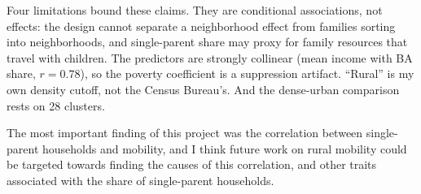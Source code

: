 \documentclass[9pt,twoside]{pnas-new}
\begin{document}
Four limitations bound these claims. They are conditional associations, not
effects: the design cannot separate a neighborhood effect from families sorting
into neighborhoods, and single-parent share may proxy for family resources that
travel with children. The predictors are strongly collinear (mean income with
BA share, $r=0.78$), so the poverty coefficient is a suppression artifact.
``Rural'' is my own density cutoff, not the Census Bureau's. And the
dense-urban comparison rests on 28 clusters.

The most important finding of this project was the correlation between
single-parent households and mobility, and I think future work on rural
mobility could be targeted towards finding the causes of this correlation, and
other traits associated with the share of single-parent households.
\end{document}
